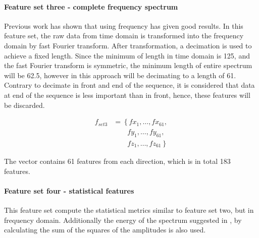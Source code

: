 \documentclass[USenglish]{ifimaster}  %
\begin{document}
\paragraph{Feature set three - complete frequency spectrum} 
Previous work has shown that using frequency has given good results. In this feature set, the raw data from time domain is transformed into the frequency domain by fast Fourier transform. After transformation, a decimation is used to achieve a fixed length. Since the minimum of length in time domain is 125, and the fast Fourier transform is symmetric, the minimum length of entire spectrum will be 62.5, however in this approach will be decimating to a length of 61. Contrary to decimate in front and end of the sequence, it is considered that data at end of the sequence is less important than in front, hence, these features will be discarded.
	
\begin{align}\label{eq:f1}
f_{set3} &= \left\{ fx_1,\dotsc,fx_{61}, \right.\nonumber\\
&\qquad \left. {} fy_1, \dotsc,fy_{61}, \right.\nonumber\\
&\qquad \left. {} fz_1,\dotsc,fz_{61}\right\}
\end{align}

The vector contains 61 features from each direction, which is in total 183 features. 
	
\paragraph{Feature set four - statistical features} 
This feature set compute the statistical metrics similar to feature set two, but in frequency domain. Additionally the energy of the spectrum suggested in \cite{26b23e912c654fe4b7478fd910130195}, by calculating the sum of the squares of the amplitudes is also used.
	
\end{document}
